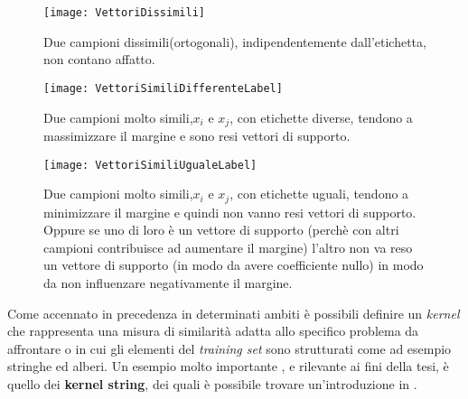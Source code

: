 \begin{figure}[htp]
	\centering
	\texttt{[image: VettoriDissimili]}
	\caption[Campioni dissimili]{Due campioni dissimili(ortogonali), indipendentemente dall'etichetta, non contano affatto.}
   \label{fig:dissp}
\end{figure}

\begin{figure}[htp]
	\centering
	\texttt{[image: VettoriSimiliDifferenteLabel]}
	\caption[Campioni simili differenti etichette]{Due campioni molto simili,$x_i$ e $x_j$, con etichette diverse, tendono a massimizzare il margine e sono resi vettori di supporto.}
   \label{fig:simpdifflab}
\end{figure}

\begin{figure}[htp]
	\centering
	\texttt{[image: VettoriSimiliUgualeLabel]}
	\caption[Campioni simili differenti etichette]{Due campioni molto simili,$x_i$ e $x_j$, con etichette uguali, tendono a minimizzare il margine e quindi non vanno resi vettori di supporto. Oppure se uno di loro è un vettore di supporto (perchè con altri campioni contribuisce ad aumentare il margine) l'altro non va reso un vettore di supporto (in modo da avere coefficiente nullo) in modo da non influenzare negativamente il margine.}
   \label{fig:simpsamelab}
\end{figure}

Come accennato in precedenza in determinati ambiti è possibili definire un \textit{kernel} che rappresenta una misura di similarità adatta allo specifico problema da affrontare o in cui gli elementi del \textit{training set} sono strutturati come ad esempio stringhe ed alberi. Un esempio molto importante , e rilevante ai fini della tesi, è quello dei \textbf{kernel string}, dei quali  è possibile trovare un'introduzione in \cite{DeLaHiguera10}. 